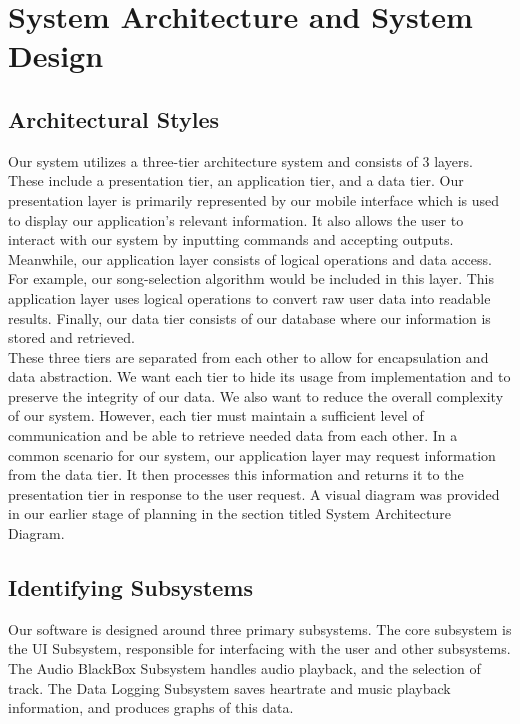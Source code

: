 \documentclass[letterpaper,english, 12pt]{scrreprt}
\begin{document}
\chapter{System Architecture and System Design}

\section{Architectural Styles}

Our system utilizes a three-tier architecture system and consists of 3 layers. These include a presentation tier, an application tier, and a data tier. Our presentation layer is primarily represented by our mobile interface which is used to display our application’s relevant information. It also allows the user to interact with our system by inputting commands and accepting outputs. Meanwhile, our application layer consists of logical operations and data access. For example, our song-selection algorithm would be included in this layer. This application layer uses logical operations to convert raw user data into readable results. Finally, our data tier consists of our database where our information is stored and retrieved. \\

These three tiers are separated from each other to allow for encapsulation and data abstraction. We want each tier to hide its usage from implementation and to preserve the integrity of our data. We also want to reduce the overall complexity of our system. However, each tier must maintain a sufficient level of communication and be able to retrieve needed data from each other. In a common scenario for our system, our application layer may request information from the data tier. It then processes this information and returns it to the presentation tier in response to the user request. A visual diagram was provided in our earlier stage of planning in the section titled System Architecture Diagram.


\section{Identifying Subsystems}
Our software is designed around three primary subsystems.
The core subsystem is the UI Subsystem, responsible for interfacing with the user and other subsystems.
The Audio BlackBox Subsystem handles audio playback, and the selection of track.
The Data Logging Subsystem saves heartrate and music playback information, and produces graphs of this data.
\\
\end{document}
